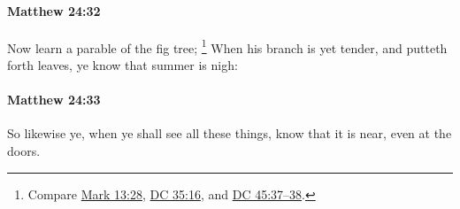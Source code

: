 		\paragraph{Matthew 24:32} %
			\label{MATTHEW-24-32}

			Now learn a parable of the fig tree;%
				\footnote{%
					Compare \hyperref[MARK-13-28]{Mark 13:28}, \hyperref[DC35-16]{DC 35:16}, and \hyperref[DC45-37]{DC 45:37--38}.
					}
			When his branch is yet tender, and putteth forth leaves, ye know that summer is nigh:

			\begin{framed}
			\scriptsize
				\begin{compactdesc}
					\item[SBLG] 
				\end{compactdesc}
			\end{framed}

		\paragraph{Matthew 24:33} %
			\label{MATTHEW-24-33}

			So likewise ye, when ye shall see all these things, know that it is near, even at the doors.

